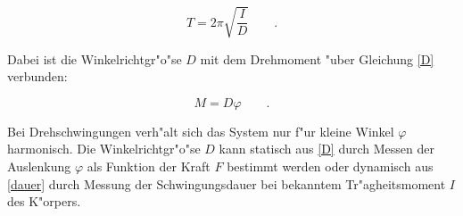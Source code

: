 	\begin{equation}
		T = 2\pi \sqrt{\frac{I}{D}} \qquad . \label{dauer}
	\end{equation}

	Dabei ist die Winkelrichtgr"o"se $D$ mit dem Drehmoment "uber Gleichung \eqref{D} verbunden:

	\begin{equation}
		M = D \varphi \qquad . \label{D}
	\end{equation}

	Bei Drehschwingungen verh"alt sich das System nur f"ur kleine Winkel $\varphi$ harmonisch.
	Die Winkelrichtgr"o"se $D$ kann statisch aus \eqref{D} durch Messen der Auslenkung $\varphi$ als Funktion der Kraft $F$ bestimmt werden oder dynamisch aus \eqref{dauer} durch Messung der Schwingungsdauer bei bekanntem Tr"agheitsmoment $I$ des K"orpers.